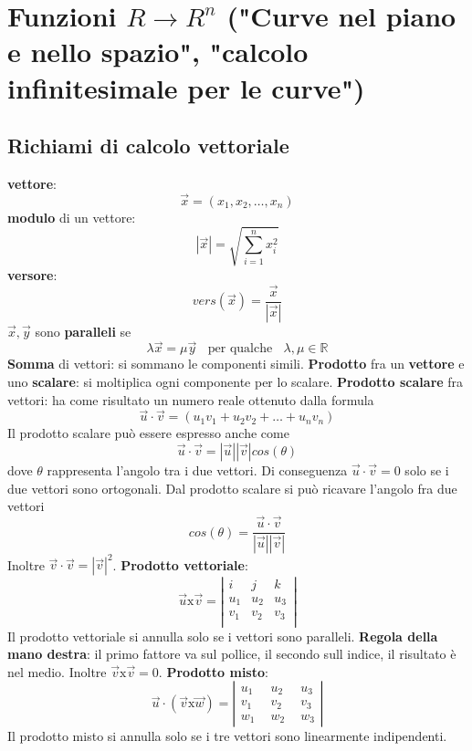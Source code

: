 \section{Funzioni $R \rightarrow R^n$ ("Curve nel piano e nello spazio", "calcolo infinitesimale per le curve")}
\subsection{Richiami di calcolo vettoriale}
\textbf{vettore}:
\[
    \vec{x} = (x_1, x_2, \dots, x_n)
\]
\textbf{modulo} di un vettore:
\[
    |\vec{x}| = \sqrt{\sum_{i=1}^{n}x_i^2}
\]
\textbf{versore}:
\[
    vers(\vec{x}) = \frac{\vec{x}}{|\vec{x}|}
\]
$\vec{x}, \vec{y}$ sono \textbf{paralleli} se
\[
    \lambda \vec{x} = \mu \vec{y}\;\; \text{ per qualche } \;\;\lambda, \mu \in \mathbb{R}
\]
\textbf{Somma} di vettori: si sommano le componenti simili.\newline
\newline
\textbf{Prodotto} fra un \textbf{vettore} e uno \textbf{scalare}: si moltiplica ogni componente per lo scalare.\newline
\newline
\textbf{Prodotto scalare} fra vettori: ha come risultato un numero reale ottenuto dalla formula
\[
    \vec{u} \cdot \vec{v} = (u_1 v_1 + u_2 v_2 + \dots + u_n v_n)
\]
Il prodotto scalare può essere espresso anche come
\[
    \vec{u} \cdot \vec{v} = |\vec{u}| |\vec{v}| cos(\theta)
\]
dove $\theta$ rappresenta l'angolo tra i due vettori. Di conseguenza $\vec{u} \cdot  \vec{v} = 0$ solo se i due vettori sono ortogonali.\newline
Dal prodotto scalare si può ricavare l'angolo fra due vettori
\[
    cos(\theta) = \frac{\vec{u} \cdot  \vec{v} }{|\vec{u}| |\vec{v}|}
\]
Inoltre $\vec{v} \cdot  \vec{v} = |\vec{v}|^2$.\newline
\newline
\textbf{Prodotto vettoriale}:
\[
    \vec{u}\text{x}\vec{v} = \left|\begin{matrix}
        i \;\; & j \;\;& k \;\;\\
        u_1 & u_2 & u_3\\
        v_1 & v_2 & v_3\\
    \end{matrix}\right|
\]
Il prodotto vettoriale si annulla solo se i vettori sono paralleli.\newline
\textbf{Regola della mano destra}: il primo fattore va sul pollice, il secondo sull indice, il risultato è nel medio.\newline
Inoltre $\vec{v} \text{x} \vec{v} = 0$.\newline
\newline
\textbf{Prodotto misto}:
\[
    \vec{u} \cdot (\vec{v} \text{x} \vec{w}) = \left|\begin{matrix}
        u_1 \;\;& u_2 \;\;& u_3\\
        v_1 &v_2 & v_3\\
        w_1 &w_2 & w_3
    \end{matrix}\right|
\]
Il prodotto misto si annulla solo se i tre vettori sono linearmente indipendenti.\newline
